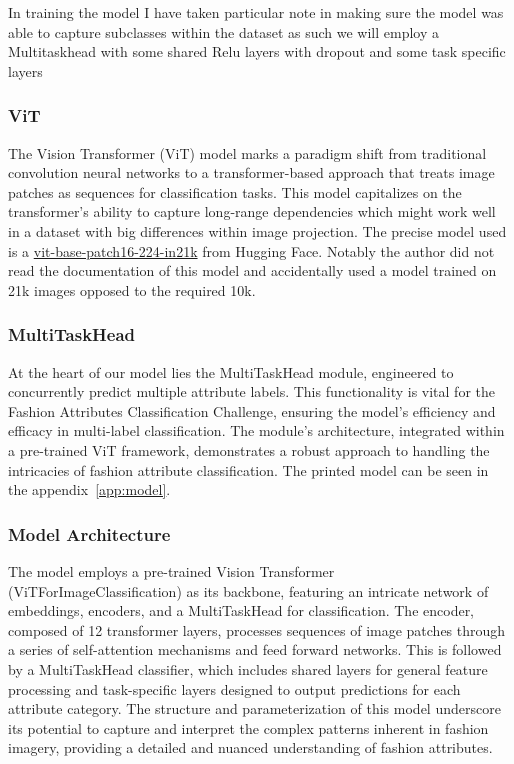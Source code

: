 \documentclass{article}
\begin{document}
In training the model I have taken particular note in making sure the model was able to capture subclasses within the dataset as such we will employ a Multitaskhead with some shared Relu layers with dropout and some task specific layers 

\subsubsection{ViT}

The Vision Transformer (ViT) model marks a paradigm shift from traditional convolution neural networks to a transformer-based approach that treats image patches as sequences for classification tasks. This model capitalizes on the transformer's ability to capture long-range dependencies which might work well in a dataset with big differences within image projection. The precise model used is a \href{https://huggingface.co/google/vit-base-patch16-224-in21k}{vit-base-patch16-224-in21k} from Hugging Face. Notably the author did not read the documentation of this model and accidentally used a model trained on 21k images opposed to the required 10k. 

\subsubsection{MultiTaskHead}

At the heart of our model lies the MultiTaskHead module, engineered to concurrently predict multiple attribute labels. This functionality is vital for the Fashion Attributes Classification Challenge, ensuring the model's efficiency and efficacy in multi-label classification. The module's architecture, integrated within a pre-trained ViT framework, demonstrates a robust approach to handling the intricacies of fashion attribute classification. The printed model can be seen in the appendix~\ref{app:model}.

\subsubsection{Model Architecture}
The model employs a pre-trained Vision Transformer (ViTForImageClassification) as its backbone, featuring an intricate network of embeddings, encoders, and a MultiTaskHead for classification. The encoder, composed of 12 transformer layers, processes sequences of image patches through a series of self-attention mechanisms and feed forward networks. This is followed by a MultiTaskHead classifier, which includes shared layers for general feature processing and task-specific layers designed to output predictions for each attribute category. The structure and parameterization of this model underscore its potential to capture and interpret the complex patterns inherent in fashion imagery, providing a detailed and nuanced understanding of fashion attributes. 
\end{document}
